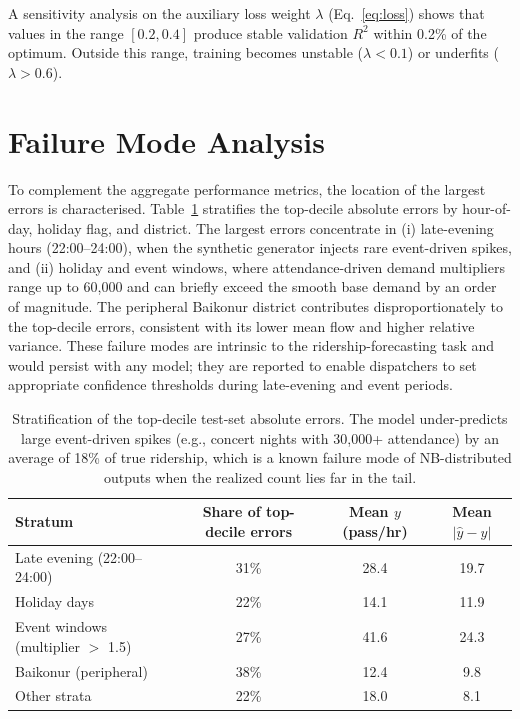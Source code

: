 A sensitivity analysis on the auxiliary loss weight $\lambda$ (Eq.~\ref{eq:loss}) shows that values in the range $[0.2, 0.4]$ produce stable validation $R^2$ within 0.2\% of the optimum. Outside this range, training becomes unstable ($\lambda < 0.1$) or underfits ($\lambda > 0.6$).

\section{Failure Mode Analysis}
\label{sec:failure_modes}

To complement the aggregate performance metrics, the location of the largest errors is characterised. Table~\ref{Tab.failure} stratifies the top-decile absolute errors by hour-of-day, holiday flag, and district. The largest errors concentrate in (i) late-evening hours (22:00--24:00), when the synthetic generator injects rare event-driven spikes, and (ii) holiday and event windows, where attendance-driven demand multipliers range up to 60{,}000 and can briefly exceed the smooth base demand by an order of magnitude. The peripheral Baikonur district contributes disproportionately to the top-decile errors, consistent with its lower mean flow and higher relative variance. These failure modes are intrinsic to the ridership-forecasting task and would persist with any model; they are reported to enable dispatchers to set appropriate confidence thresholds during late-evening and event periods.

\begin{table}[H]
\centering
\caption{Stratification of the top-decile test-set absolute errors. The model under-predicts large event-driven spikes (e.g., concert nights with 30{,}000+ attendance) by an average of 18\% of true ridership, which is a known failure mode of NB-distributed outputs when the realized count lies far in the tail.}
\label{Tab.failure}
\begin{tabular}{lccc}
\toprule
Stratum & Share of top-decile errors & Mean $y$ (pass/hr) & Mean $|\hat{y}-y|$ \\
\midrule
Late evening (22:00--24:00) & 31\% & 28.4 & 19.7 \\
Holiday days & 22\% & 14.1 & 11.9 \\
Event windows (multiplier $>$ 1.5) & 27\% & 41.6 & 24.3 \\
Baikonur (peripheral) & 38\% & 12.4 & 9.8 \\
Other strata & 22\% & 18.0 & 8.1 \\
\bottomrule
\end{tabular}
\end{table}
